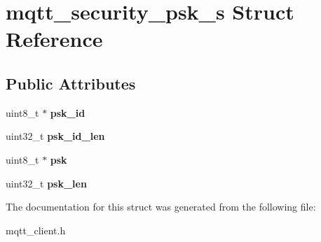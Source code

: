 \hypertarget{structmqtt__security__psk__s}{}\section{mqtt\+\_\+security\+\_\+psk\+\_\+s Struct Reference}
\label{structmqtt__security__psk__s}
\subsection*{Public Attributes}
\begin{DoxyCompactItemize}
\item 
\mbox{\label{structmqtt__security__psk__s_acc2cd91a7e9cc7d04e507a5bc2507460}} 
uint8\+\_\+t $\ast$ {\bfseries psk\+\_\+id}
\item 
\mbox{\label{structmqtt__security__psk__s_aab656bf8a40d58f63ab8420ebb9d3ea9}} 
uint32\+\_\+t {\bfseries psk\+\_\+id\+\_\+len}
\item 
\mbox{\label{structmqtt__security__psk__s_a4405deeae3ffbad54a990d01fef4841c}} 
uint8\+\_\+t $\ast$ {\bfseries psk}
\item 
\mbox{\label{structmqtt__security__psk__s_aaf237a2502bde0520b8c381f69add753}} 
uint32\+\_\+t {\bfseries psk\+\_\+len}
\end{DoxyCompactItemize}


The documentation for this struct was generated from the following file\+:\begin{DoxyCompactItemize}
\item 
mqtt\+\_\+client.\+h\end{DoxyCompactItemize}
